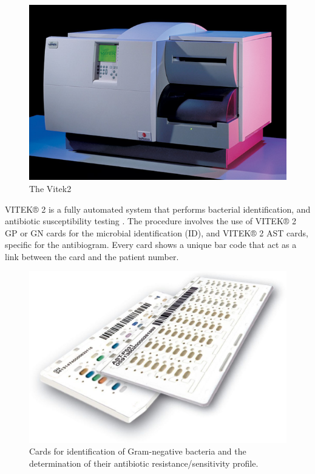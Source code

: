 \documentclass[11pt]{report}
\begin{document}
\begin{figure}[htp]
\centering
\includegraphics[scale=0.500]{immagini gamalero/Vitek_III.jpg}
\caption{The Vitek2}
\label{}
\end{figure}

VITEK® 2 is a fully automated system that performs bacterial identification, and antibiotic susceptibility testing \cite{Vitek2}.
The procedure involves the use of VITEK® 2 GP or GN cards for the microbial identification (ID), and VITEK® 2 AST cards, specific for the antibiogram.
Every card shows a unique bar code that act as a link between the card and the patient number.

\begin{figure}[htp]
\centering
\includegraphics[scale=0.20]{immagini gamalero/Vitek_Cards.jpg}
\caption{Cards for identification of Gram-negative bacteria and the determination of their antibiotic resistance/sensitivity profile.}
\label{}
\end{figure}
\end{document}

